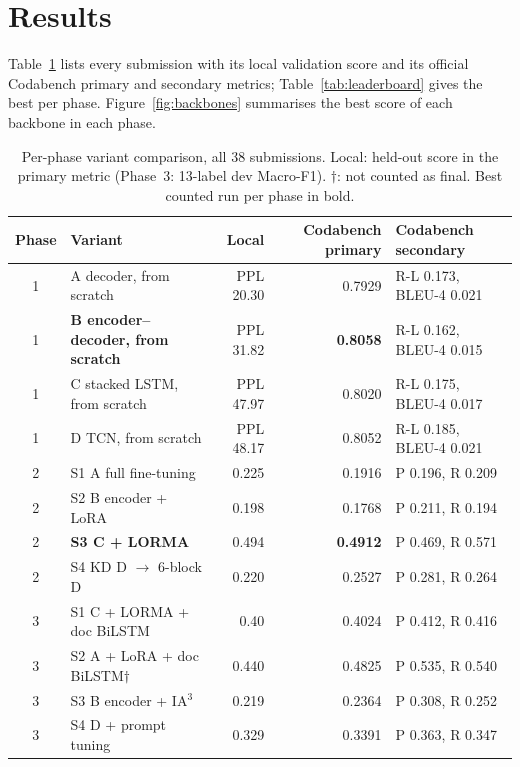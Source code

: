 \documentclass[11pt, oneside]{article}
\newcommand{\A}{\textsf{A}}\newcommand{\B}{\textsf{B}}\newcommand{\C}{\textsf{C}}\newcommand{\D}{\textsf{D}}
\begin{document}
\section{Results}
Table~\ref{tab:variants} lists every submission with its local validation score and its official Codabench primary and secondary metrics; Table~\ref{tab:leaderboard} gives the best per phase. Figure~\ref{fig:backbones} summarises the best score of each backbone in each phase.

\begin{table}[t]
\centering\scriptsize\setlength{\tabcolsep}{3pt}\renewcommand{\arraystretch}{0.86}
\caption{Per-phase variant comparison, all 38 submissions. Local: held-out score in the primary metric (Phase~3: 13-label dev Macro-F1). $\dagger$: not counted as final. Best counted run per phase in bold.}
\label{tab:variants}
\begin{tabular}{clrrl}
\toprule
Phase & Variant & Local & Codabench primary & Codabench secondary \\
\midrule
1 & \A{} decoder, from scratch & PPL 20.30 & 0.7929 & R-L 0.173, BLEU-4 0.021 \\
1 & \textbf{\B{} encoder--decoder, from scratch} & PPL 31.82 & \textbf{0.8058} & R-L 0.162, BLEU-4 0.015 \\
1 & \C{} stacked LSTM, from scratch & PPL 47.97 & 0.8020 & R-L 0.175, BLEU-4 0.017 \\
1 & \D{} TCN, from scratch & PPL 48.17 & 0.8052 & R-L 0.185, BLEU-4 0.021 \\\midrule
2 & S1 \A{} full fine-tuning & 0.225 & 0.1916 & P 0.196, R 0.209 \\
2 & S2 \B{} encoder + LoRA & 0.198 & 0.1768 & P 0.211, R 0.194 \\
2 & \textbf{S3 \C{} + LORMA} & 0.494 & \textbf{0.4912} & P 0.469, R 0.571 \\
2 & S4 KD \D{} $\rightarrow$ 6-block \D{} & 0.220 & 0.2527 & P 0.281, R 0.264 \\\midrule
3 & S1 \C{} + LORMA + doc BiLSTM & 0.40 & 0.4024 & P 0.412, R 0.416 \\
3 & S2 \A{} + LoRA + doc BiLSTM$\dagger$ & 0.440 & 0.4825 & P 0.535, R 0.540 \\
3 & S3 \B{} encoder + IA$^3$ & 0.219 & 0.2364 & P 0.308, R 0.252 \\
3 & S4 \D{} + prompt tuning & 0.329 & 0.3391 & P 0.363, R 0.347 \\

\end{tabular}
\end{table}
\end{document}
